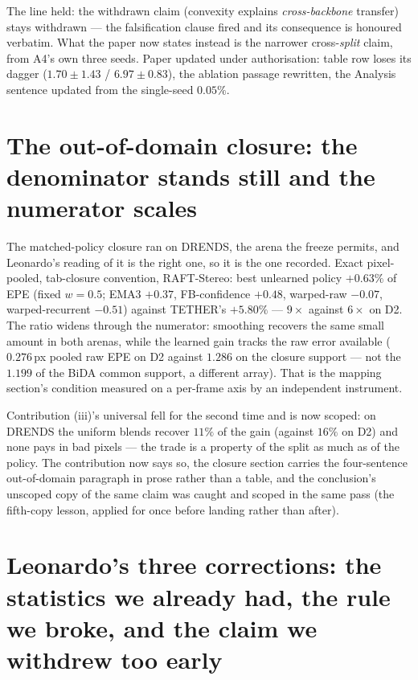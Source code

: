 \documentclass[11pt,a4paper]{article}
\begin{document}
The line held: the withdrawn claim (convexity explains \emph{cross-backbone}
transfer) stays withdrawn --- the falsification clause fired and its
consequence is honoured verbatim. What the paper now states instead is the
narrower cross-\emph{split} claim, from A4's own three seeds. Paper updated
under authorisation: table row loses its dagger ($1.70\pm1.43$ /
$6.97\pm0.83$), the ablation passage rewritten, the Analysis sentence
updated from the single-seed $0.05\%$.



\section*{The out-of-domain closure: the denominator stands still and the numerator scales}

The matched-policy closure ran on DRENDS, the arena the freeze permits, and
Leonardo's reading of it is the right one, so it is the one recorded. Exact
pixel-pooled, tab-closure convention, RAFT-Stereo: best unlearned policy
$+0.63\%$ of EPE (fixed $w{=}0.5$; EMA3 $+0.37$, FB-confidence $+0.48$,
warped-raw $-0.07$, warped-recurrent $-0.51$) against TETHER's $+5.80\%$ ---
$9\times$ against $6\times$ on D2. The ratio widens through the numerator:
smoothing recovers the same small amount in both arenas, while the learned
gain tracks the raw error available ($0.276$\,px pooled raw EPE on D2 against
$1.286$ on the closure support --- not the $1.199$ of the BiDA common
support, a different array). That is the mapping section's condition measured
on a per-frame axis by an independent instrument.

Contribution (iii)'s universal fell for the second time and is now scoped:
on DRENDS the uniform blends recover $11\%$ of the gain (against $16\%$ on
D2) and none pays in bad pixels --- the trade is a property of the split as
much as of the policy. The contribution now says so, the closure section
carries the four-sentence out-of-domain paragraph in prose rather than a
table, and the conclusion's unscoped copy of the same claim was caught and
scoped in the same pass (the fifth-copy lesson, applied for once before
landing rather than after).



\section*{Leonardo's three corrections: the statistics we already had, the rule we broke, and the claim we withdrew too early}
\end{document}
